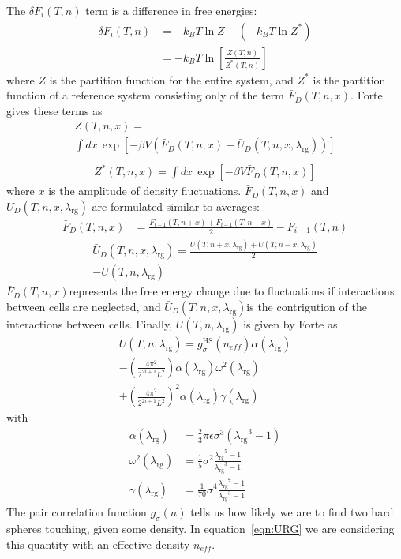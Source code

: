 \documentclass[letterpaper,twocolumn,amsmath,amssymb,prb]{revtex4-1}
\newcommand{\kT}{\ensuremath{k_BT}}
\newcommand{\neff}{\ensuremath{n_\textit{eff}}}
\newcommand{\lambdaRG}{\ensuremath{\lambda_\text{rg}}}
\newcommand{\FbarD}{\ensuremath{\bar{F}_D(T,n,x)}}
\newcommand{\UbarD}{\ensuremath{\bar{U}_D(T,n,x,\lambdaRG)}}
\begin{document}
The $\delta F_i(T,n)$ term is a difference in free energies:
\begin{align}
  \delta F_i(T,n) &= -\kT\ln Z - \left( -\kT\ln Z^* \right) \nonumber \\
  &= -\kT\ln\left[ \frac{Z(T,n)}{Z^*(T,n)} \right]
\end{align}
where $Z$ is the partition function for the entire system, and $Z^*$
is the partition function of a reference system consisting only of the
term $\FbarD$. Forte gives these terms as
\begin{multline}
  Z(T,n,x) = \\ \int dx\, \exp\left[-\beta V\left( \FbarD + \UbarD \right)\right] \label{eqn:Z} \\
\end{multline}
\begin{multline}
  Z^*(T,n,x) = \int dx\, \exp\left[ -\beta V\FbarD \right] \label{eqn:Zstar}
\end{multline}
where $x$ is the amplitude of density fluctuations. $\FbarD$ and $\UbarD$ are formulated similar to averages:
\begin{align}
  \FbarD &= \frac{F_{i-1}(T,n+x) + F_{i-1}(T,n-x)}{2} - F_{i-1}(T,n)
\end{align}
\begin{multline}
  \UbarD = \frac{U(T,n+x,\lambdaRG) + U(T,n-x,\lambdaRG)}{2} \\
  - U(T,n,\lambdaRG)
\end{multline}
\FbarD represents the free energy change due to fluctuations if interactions between cells are neglected, and \UbarD is the contrigution of the interactions between cells. Finally, $U(T,n,\lambdaRG)$ is given by Forte as
\begin{multline}
  U(T,n,\lambdaRG) = g_\sigma^\text{HS}(\neff)\alpha(\lambdaRG) \\
  - \left( \frac{4\pi^2}{2^{2i+1}L^2} \right)\alpha(\lambdaRG)\omega^2(\lambdaRG) \\
  + \left( \frac{4\pi^2}{2^{2i+1}L^2} \right)^2\alpha(\lambdaRG)\gamma(\lambdaRG) \label{eqn:URG} %
\end{multline}
with
\begin{align}
  \alpha(\lambdaRG) &= \frac{2}{3}\pi\epsilon\sigma^3(\lambdaRG^3 - 1) \\
  \omega^2(\lambdaRG) &= \frac{1}{5}\sigma^2\frac{\lambdaRG^5 - 1}{\lambdaRG^3 - 1} \\
  \gamma(\lambdaRG) &= \frac{1}{70}\sigma^4\frac{\lambdaRG^7 - 1}{\lambdaRG^3 - 1}
\end{align}
The pair correlation function $g_\sigma(n)$ tells us how likely we
are to find two hard spheres touching, given some density. In
equation~\ref{eqn:URG} we are considering this quantity with an
effective density \neff.
\end{document}
